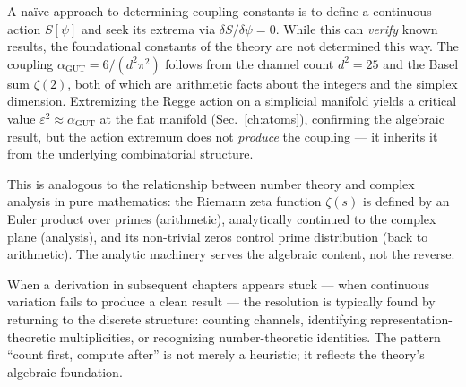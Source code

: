 \begin{remark}
A na\"ive approach to determining coupling constants is to define a continuous action $S[\psi]$ and seek its extrema via $\delta S/\delta\psi = 0$. While this can \emph{verify} known results, the foundational constants of the theory are not determined this way. The coupling $\alpha_{\mathrm{GUT}} = 6/(d^2\pi^2)$ follows from the channel count $d^2 = 25$ and the Basel sum $\zeta(2)$, both of which are arithmetic facts about the integers and the simplex dimension. Extremizing the Regge action on a simplicial manifold yields a critical value $\varepsilon^2 \approx \alpha_{\mathrm{GUT}}$ at the flat manifold (Sec.~\ref{ch:atoms}), confirming the algebraic result, but the action extremum does not \emph{produce} the coupling --- it inherits it from the underlying combinatorial structure.

This is analogous to the relationship between number theory and complex analysis in pure mathematics: the Riemann zeta function $\zeta(s)$ is defined by an Euler product over primes (arithmetic), analytically continued to the complex plane (analysis), and its non-trivial zeros control prime distribution (back to arithmetic). The analytic machinery serves the algebraic content, not the reverse.
\end{remark}

\begin{remark}
When a derivation in subsequent chapters appears stuck --- when continuous variation fails to produce a clean result --- the resolution is typically found by returning to the discrete structure: counting channels, identifying representation-theoretic multiplicities, or recognizing number-theoretic identities. The pattern ``count first, compute after'' is not merely a heuristic; it reflects the theory's algebraic foundation.
\end{remark}
